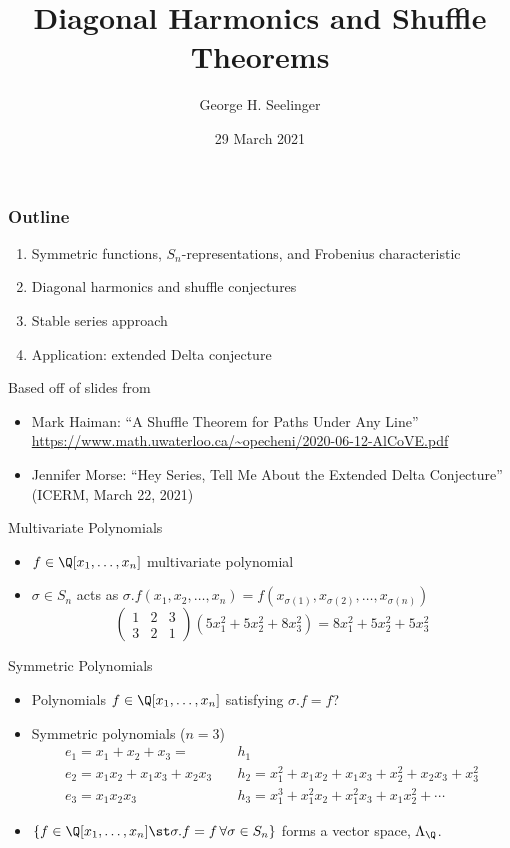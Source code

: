 \documentclass{beamer}
\title[Shuffle Theorems]{Diagonal Harmonics and Shuffle Theorems} %
\author[George H. Seelinger]{George H. Seelinger} %
\institute[UVA] %
{
  \medskip
\textit{ghs9ae@virginia.edu}\\ %
\medskip
UVA Graduate Seminar %
}
\date{29 March 2021} %
\newcommand{\sym}{\Lambda}
\begin{document}
\begin{frame}
 \titlepage 
\end{frame}
\begin{frame}
  \frametitle{Outline}
  \begin{enumerate}
  \item Symmetric functions, \(S_n\)-representations, and Frobenius characteristic
  \item Diagonal harmonics and shuffle conjectures
  \item Stable series approach
  \item Application: extended Delta conjecture
  \end{enumerate}\pause
  Based off of slides from
  \begin{itemize}
  \item Mark Haiman: ``A Shuffle Theorem for Paths Under Any Line''\\
    \url{https://www.math.uwaterloo.ca/~opecheni/2020-06-12-AlCoVE.pdf}
  \item Jennifer Morse: ``Hey Series, Tell Me About the Extended Delta
    Conjecture'' (ICERM, March 22, 2021)
  \end{itemize}
\end{frame}
\begin{frame}{Multivariate Polynomials}
  \begin{itemize}
  \item \(f \in \Q[x_1,\ldots,x_n]\) multivariate polynomial \pause
  \item \(\sigma \in S_n\) acts as \(\sigma.f(x_1,x_2,\ldots,x_n) =
    f(x_{\sigma(1)}, x_{\sigma(2)},\ldots,x_{\sigma(n)})\)
    \[
      \left(
        \begin{matrix}
          1 & 2 & 3\\
          3 & 2 & 1
        \end{matrix}
      \right) (5x_1^2+5x_2^2+8x_3^2) = 8x_1^2+5x_2^2+5x_3^2
    \]
  \end{itemize}
\end{frame}
\begin{frame}{Symmetric Polynomials}
  \begin{itemize}
    \item Polynomials \(f \in \Q[x_1,\ldots,x_n]\) satisfying \(\sigma.f
    = f\)? \pause
  \item Symmetric polynomials (\(n=3\))
    \begin{align*}
      e_1 = x_1 + x_2 + x_3 = & h_1  \\
      e_2 = x_1 x_2 + x_1 x_3 + x_2 x_3 \quad & h_2 = x_1^2 + x_1 x_2 + x_1
                                          x_3 + x_2^2 +  x_2 x_3 +x_3^2  \\
      e_3 = x_1 x_2 x_3 \quad & h_3 = x_1^3 + x_1^2 x_2 + x_1^2 x_3 + x_1
                          x_2^2 + \cdots
    \end{align*} \pause
  \item \(\{f \in \Q[x_1,\ldots,x_n] \st \sigma.f = f \, \forall \sigma
    \in S_n\}\) forms a vector space, \(\sym_\Q\).
\end{itemize}
\end{frame}
\end{document}
